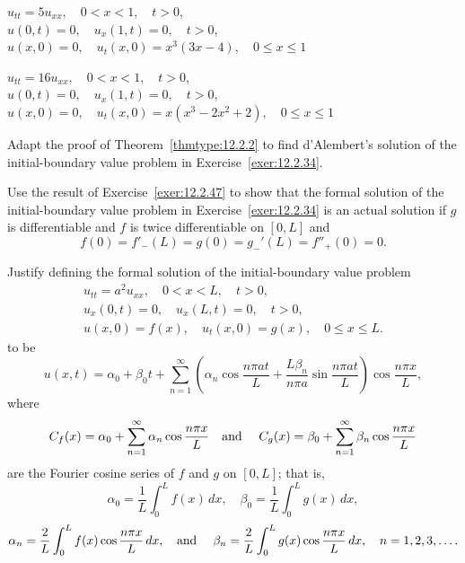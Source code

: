 \begin{exerciselist}
  \item\label{exer:12.2.45} $u_{tt}=5u_{xx},\quad0<x<1,\quad t>0$,\\ $u(0,t)=0,\quad u_{x}(1,t)=0,\quad t>0$,\\ $u(x,0)=0,\quad u_{t}(x,0)=x^{3}(3x-4),\quad0\le x\le1$

  \item\label{exer:12.2.46} \Cex $u_{tt}=16u_{xx},\quad0<x<1,\quad t>0$,\\ $u(0,t)=0,\quad u_{x}(1,t)=0,\quad t>0$,\\ $u(x,0)=0,\quad u_{t}(x,0)=x(x^{3}-2x^{2}+2),\quad0\le x\le1$

  \item\label{exer:12.2.47} Adapt the proof of Theorem~\ref{thmtype:12.2.2} to find d'Alembert's
        solution of the initial-boundary value problem in Exercise~\ref{exer:12.2.34}.

  \item\label{exer:12.2.48} Use the result of Exercise~\ref{exer:12.2.47} to show that the formal
        solution of the initial-boundary value problem in Exercise~\ref{exer:12.2.34} is an actual
        solution if $g$ is differentiable and $f$ is twice differentiable on $[0,L]$ and
  \[
    f(0)=f'_{-}(L)=g(0)=g_{-}'(L)=f''_{+}(0)=0.
  \]

  \item\label{exer:12.2.49} Justify defining the formal solution of the initial-boundary value
        problem
  \[
    \begin{array}{c}
      u_{tt}=a^{2}u_{xx},\quad0<x<L,\quad t>0,            \\
      u_{x}(0,t)=0,\quad u_{x}(L,t)=0,\quad t>0,          \\
      u(x,0)=f(x),\quad u_{t}(x,0)=g(x),\quad0\le x\le L.
    \end{array}
  \]
  to be
  \[
    u(x,t)=\alpha_{0}+\beta_{0}t+\sum_{n=1}^{\infty}\left(\alpha_{n}\cos\frac{n\pi at}{L}+\frac{L\beta_{n}}{n\pi a}\sin\frac{n\pi at}{L}\right) \cos\frac{n\pi x}{L},
  \]
  where
  \[
    C_{f}(x)=\alpha_{0}+\sum_{n=1}^{\infty}\alpha_{n}\cos\frac{n\pi x}{L}\mbox{\quad and \quad}C_{g}(x)=\beta_{0}+\sum_{n=1}^{\infty}\beta_{n}\cos\frac{n\pi x}{L}
  \]
  are the Fourier cosine series of $f$ and $g$ on $[0,L]$; that is,
  \[
    \alpha_{0}=\frac{1}{L}\int_{0}^{L}f(x)\,dx,\quad \beta_{0}=\frac{1}{L}\int_{0}^{L}g(x)\,dx,
  \]
  \[
    \alpha_{n}=\frac{2}{L}\int_{0}^{L}f(x)\cos\frac{n\pi x}{L}\,dx, \mbox{\quad and \quad}\beta_{n}=\frac{2}{L}\int_{0}^{L}g(x)\cos\frac{n\pi x}{L}\,dx,\quad n=1,2,3,\dots.
  \]


\end{exerciselist}
